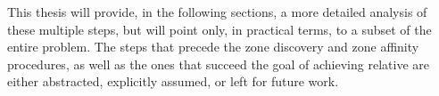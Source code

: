 This thesis will provide, in the following sections, a more detailed analysis of these multiple steps, but will point only, in practical terms, to a subset of the entire problem. The steps that precede the zone discovery and zone affinity procedures, as well as the ones that succeed the goal of achieving relative \pol{} are either abstracted, explicitly assumed, or left for future work.

